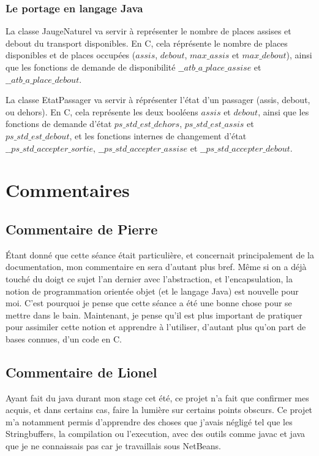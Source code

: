 \documentclass[a4paper,11pts]{article}
\begin{document}
\subsubsection{Le portage en langage Java}
La classe JaugeNaturel va servir à représenter le nombre de places assises et debout du transport disponibles. En C, cela réprésente le nombre de places disponibles et de places occupées ($assis$, $debout$, $max\_assis$ et $max\_debout$), ainsi que les fonctions de demande de disponibilité $\_\_atb\_a\_place\_assise$ et $\_\_atb\_a\_place\_debout$.

La classe EtatPassager va servir à réprésenter l'état d'un passager (assis, debout, ou dehors). En C, cela représente les deux booléens $assis$ et $debout$, ainsi que les fonctions de demande d'état $ps\_std\_est\_dehors$, $ps\_std\_est\_assis$ et $ps\_std\_est\_debout$, et les fonctions internes de changement d'état $\_\_ps\_std\_accepter\_sortie$, $\_\_ps\_std\_accepter\_assise$ et $\_\_ps\_std\_accepter\_debout$.

\section{Commentaires}
\subsection{Commentaire de Pierre}
Étant donné que cette séance était particulière, et concernait principalement de la documentation, mon commentaire en sera d'autant plus bref. Même si on a déjà touché du doigt ce sujet l'an dernier avec l'abstraction, et l'encapsulation, la notion de programmation orientée objet (et le langage Java) est nouvelle pour moi. C'est pourquoi je pense que cette séance a été une bonne chose pour se mettre dans le bain. Maintenant, je pense qu'il est plus important de pratiquer pour assimiler cette notion et apprendre à l'utiliser, d'autant plus qu'on part de bases connues, d'un code en C.
\subsection{Commentaire de Lionel}
Ayant fait du java durant mon stage cet été, ce projet n'a fait que confirmer mes acquis, et dans certains cas, faire la lumière sur certains points obscurs. Ce projet m'a notamment permis d'apprendre des choses que j'avais négligé tel que les Stringbuffers, la compilation ou l'execution, avec des outils comme javac et java que je ne connaissais pas car je travaillais sous NetBeans.
\end{document}
